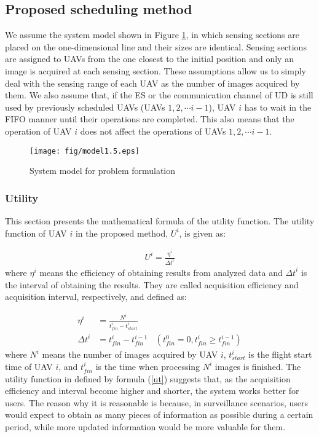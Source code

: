 \documentclass[journal]{IEEEtran}
\begin{document}
\subsection{Proposed scheduling method}\label{math}
We assume the system model shown in Figure  \ref{model1.5}, in which sensing sections are placed on the one-dimensional line and their sizes are identical.
%
Sensing sections are assigned to UAVs from the one closest to the initial position and only an image is acquired at each sensing section.
%
These assumptions allow us to simply deal with the sensing range of each UAV as the number of images acquired by them.
%
We also assume that, if the ES or the communication channel of UD is still used by previously scheduled UAVs (UAVs $1, 2, \cdots i-1$), UAV $i$ has to wait in the FIFO manner until their operations are completed.
%
This also means that the operation of UAV $i$ does not affect the operations of UAVs $1, 2, \cdots i-1$.

\begin{figure}[t]
\begin{center}
\texttt{[image: fig/model1.5.eps]}
\caption{System model for problem formulation}
\label{model1.5}
\end{center}
\end{figure}

\subsubsection{Utility}\label{to}
This section presents the mathematical formula of the utility function.
%
The utility function of UAV $i$ in the proposed method, $U^i$, is given as:

\begin{align}
U^i = \frac{\eta^i}{{\Delta{t}}^i} \label{ut}
\end{align}
where $\eta^i$ means the efficiency of obtaining results from analyzed data and ${\Delta{t}}^i$ is the interval of obtaining the results.
%
They are called acquisition efficiency and acquisition interval, respectively, and defined as:

\begin{align}
\eta^i&=\frac{N^i}{{t_{fin}^i}-{t_{start}^i}} \label{f1}\\
{\Delta{t}}^i &= {t_{fin}^i}-t_{fin}^{i-1}~~~~(t_ {fin}^0=0, {t_{fin}^i}\geq{t_{fin}^{i-1}}) \label{f2}
\end{align}
where $N^i$ means the number of images acquired by UAV $i$, $t_{start}^i$ is the flight start time of UAV $i$, and $t_{fin}^i$ is the time when processing $N^i$ images is finished.
%
The utility function in defined by formula (\ref{ut}) suggests that, as the acquisition efficiency and interval become higher and shorter, the system works better for users.
%
The reason why it is reasonable is because, in surveillance scenarios, users would expect to obtain as many pieces of information as possible during a certain period, while more updated information would be more valuable for them.
\end{document}
